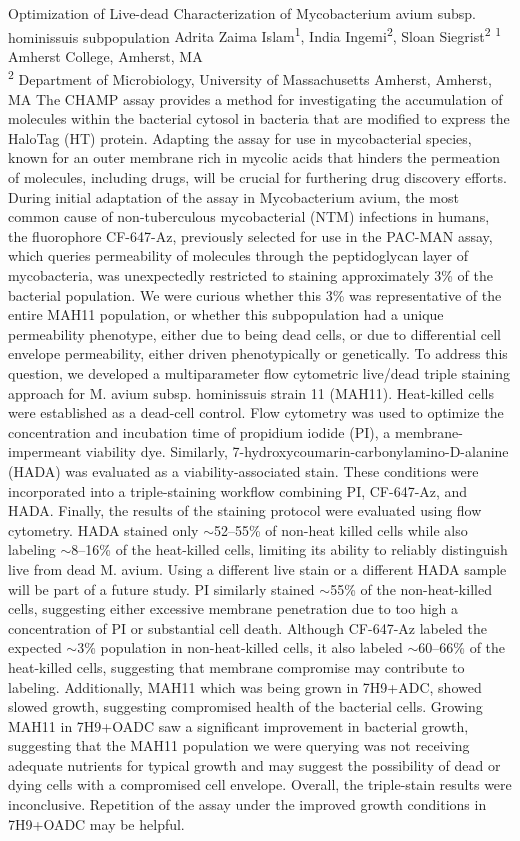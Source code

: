 \makeabstract
    {
    Optimization of Live-dead Characterization of Mycobacterium avium subsp. hominissuis subpopulation
    }
    {
    Adrita Zaima Islam\textsuperscript{1}, India Ingemi\textsuperscript{2}, Sloan Siegrist\textsuperscript{2}
    }
    {
    \textsuperscript{1} Amherst College, Amherst, MA\\
\textsuperscript{2} Department of Microbiology, University of Massachusetts Amherst, Amherst, MA
    }
    {
    The CHAMP assay provides a method for investigating the accumulation of molecules within the bacterial cytosol in bacteria that are modified to express the HaloTag (HT) protein. Adapting the assay for use in mycobacterial species, known for an outer membrane rich in mycolic acids that hinders the permeation of molecules, including drugs, will be crucial for furthering drug discovery efforts. During initial adaptation of the assay in Mycobacterium avium, the most common cause of non-tuberculous mycobacterial (NTM) infections in humans, the fluorophore CF-647-Az, previously selected for use in the PAC-MAN assay, which queries permeability of molecules through the peptidoglycan layer of mycobacteria, was unexpectedly restricted to staining approximately 3\% of the bacterial population. We were curious whether this 3\% was representative of the entire MAH11 population, or whether this subpopulation had a unique permeability phenotype, either due to being dead cells, or due to differential cell envelope permeability, either driven phenotypically or genetically.
    }
    {
    To address this question, we developed a multiparameter flow cytometric live/dead triple staining approach for M. avium subsp. hominissuis strain 11 (MAH11). Heat-killed cells were established as a dead-cell control. Flow cytometry was used to optimize the concentration and incubation time of propidium iodide (PI), a membrane-impermeant viability dye. Similarly, 7-hydroxycoumarin-carbonylamino-D-alanine (HADA) was evaluated as a viability-associated stain. These conditions were incorporated into a triple-staining workflow combining PI, CF-647-Az, and HADA. Finally, the results of the staining protocol were evaluated using flow cytometry.  
    }
    {
    HADA stained only $\sim$52--55\% of non-heat killed cells while also labeling $\sim$8--16\% of the heat-killed cells, limiting its ability to reliably distinguish live from dead M. avium. Using a different live stain or a different HADA sample will be part of a future study. PI similarly stained $\sim$55\% of the non-heat-killed cells, suggesting either excessive membrane penetration due to too high a concentration of PI or substantial cell death. Although CF-647-Az labeled the expected $\sim$3\% population in non-heat-killed cells, it also labeled $\sim$60--66\% of the heat-killed cells, suggesting that membrane compromise may contribute to labeling. Additionally, MAH11 which was being grown in 7H9+ADC, showed slowed growth, suggesting compromised health of the bacterial cells. Growing MAH11 in 7H9+OADC saw a significant improvement in bacterial growth, suggesting that the MAH11 population we were querying was not receiving adequate nutrients for typical growth and may suggest the possibility of dead or dying cells with a compromised cell envelope. 
    }
    {
    Overall, the triple-stain results were inconclusive. Repetition of the assay under the improved growth conditions in 7H9+OADC may be helpful.
    }

    \newpage
    